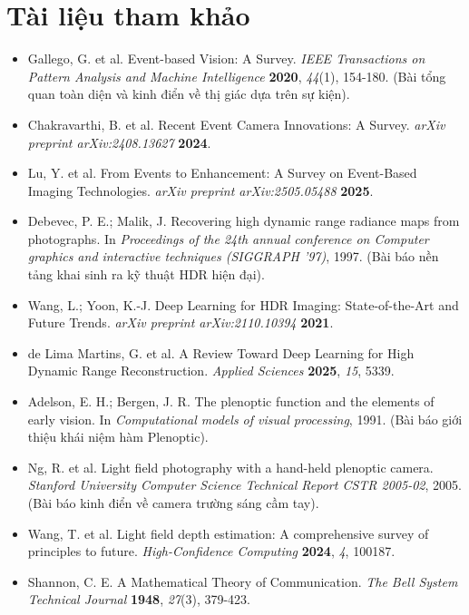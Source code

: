 \section*{Tài liệu tham khảo}
\begin{itemize}
    \item[1] Gallego, G. et al. Event-based Vision: A Survey. \textit{IEEE Transactions on Pattern Analysis and Machine Intelligence} \textbf{2020}, \textit{44}(1), 154-180. (Bài tổng quan toàn diện và kinh điển về thị giác dựa trên sự kiện).
    \item[2] Chakravarthi, B. et al. Recent Event Camera Innovations: A Survey. \textit{arXiv preprint arXiv:2408.13627} \textbf{2024}.
    \item[3] Lu, Y. et al. From Events to Enhancement: A Survey on Event-Based Imaging Technologies. \textit{arXiv preprint arXiv:2505.05488} \textbf{2025}.
    \item[4] Debevec, P. E.; Malik, J. Recovering high dynamic range radiance maps from photographs. In \textit{Proceedings of the 24th annual conference on Computer graphics and interactive techniques (SIGGRAPH '97)}, 1997. (Bài báo nền tảng khai sinh ra kỹ thuật HDR hiện đại).
    \item[5] Wang, L.; Yoon, K.-J. Deep Learning for HDR Imaging: State-of-the-Art and Future Trends. \textit{arXiv preprint arXiv:2110.10394} \textbf{2021}.
    \item[6] de Lima Martins, G. et al. A Review Toward Deep Learning for High Dynamic Range Reconstruction. \textit{Applied Sciences} \textbf{2025}, \textit{15}, 5339.
    \item[7] Adelson, E. H.; Bergen, J. R. The plenoptic function and the elements of early vision. In \textit{Computational models of visual processing}, 1991. (Bài báo giới thiệu khái niệm hàm Plenoptic).
    \item[8] Ng, R. et al. Light field photography with a hand-held plenoptic camera. \textit{Stanford University Computer Science Technical Report CSTR 2005-02}, 2005. (Bài báo kinh điển về camera trường sáng cầm tay).
    \item[9] Wang, T. et al. Light field depth estimation: A comprehensive survey of principles to future. \textit{High-Confidence Computing} \textbf{2024}, \textit{4}, 100187.
    \item[10] Shannon, C. E. A Mathematical Theory of Communication. \textit{The Bell System Technical Journal} \textbf{1948}, \textit{27}(3), 379-423.
\end{itemize}